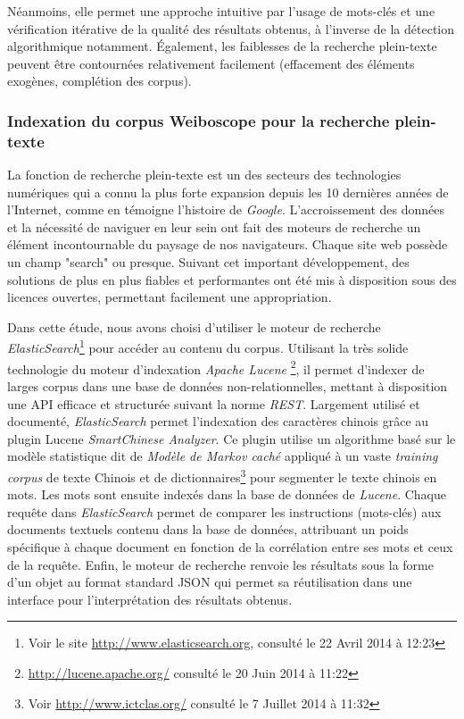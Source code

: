     Néanmoins, elle permet une approche intuitive par l'usage de mots-clés et une vérification itérative de la qualité des résultats obtenus, à l'inverse de la détection algorithmique notamment. Également, les faiblesses de la recherche plein-texte peuvent être contournées relativement facilement (effacement des éléments exogènes, complétion des corpus). 

\subsubsection[Indexation pour la recherche plein-texte]{Indexation du corpus Weiboscope pour la recherche plein-texte}

    La fonction de recherche plein-texte est un des secteurs des technologies numériques qui a connu la plus forte expansion depuis les 10 dernières années de l'Internet, comme en témoigne l'histoire de \textit{Google}. L'accroissement des données et la nécessité de naviguer en leur sein ont fait des moteurs de recherche un élément incontournable du paysage de nos navigateurs. Chaque site web possède un champ "search" ou presque. Suivant cet important développement, des solutions de plus en plus fiables et performantes ont été mis à disposition sous des licences ouvertes, permettant facilement une appropriation.

    Dans cette étude, nous avons choisi d'utiliser le moteur de recherche \textit{ElasticSearch}\footnote{Voir le site \url{http://www.elasticsearch.org}, consulté le 22 Avril 2014 à 12:23} pour accéder au contenu du corpus. Utilisant la très solide technologie du  moteur d'indexation \textit{Apache Lucene}  \footnote{ \url{http://lucene.apache.org/} consulté le 20 Juin 2014 à 11:22}, il permet d'indexer de larges corpus dans une base de données non-relationnelles, mettant à disposition une API efficace et structurée suivant la norme \textit{REST}. Largement utilisé et documenté, \textit{ElasticSearch} permet l'indexation des caractères chinois grâce au plugin Lucene \textit{SmartChinese Analyzer}. Ce plugin utilise un algorithme basé sur le modèle statistique dit de \textit{Modèle de Markov caché} appliqué à un vaste \textit{training corpus} de texte Chinois et de dictionnaires\footnote{Voir \url{http://www.ictclas.org/} consulté le 7 Juillet 2014 à 11:32} pour segmenter le texte chinois en mots. Les mots sont ensuite indexés dans la base de données de \textit{Lucene}. Chaque requête dans \textit{ElasticSearch} permet de comparer les instructions (mots-clés) aux documents textuels contenu dans la base de données, attribuant un poids spécifique à chaque document en fonction de la corrélation entre ses mots et ceux de la requête. Enfin, le moteur de recherche renvoie les résultats sous la forme d'un objet au format standard JSON qui permet sa réutilisation dans une interface pour l'interprétation des résultats obtenus.

